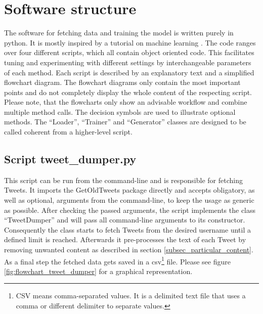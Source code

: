 \documentclass[hidelinks, conference]{IEEEtran}
\begin{document}
\section{Software structure}

The software for fetching data and training the model is written purely in python. It is mostly inspired by a tutorial on machine learning \cite{tutrob}. The code ranges over four different scripts, which all contain object oriented code. This facilitates tuning and experimenting with different settings by interchangeable parameters of each method. Each script is described by an explanatory text and a simplified flowchart diagram. The flowchart diagrams only contain the most important points and do not completely display the whole content of the respecting script. Please note, that the flowcharts only show an advisable workflow and combine multiple method calls. The decision symbols are used to illustrate optional methods. The ``Loader'', ``Trainer'' and ``Generator'' classes are designed to be called coherent from a higher-level script.

\subsection{Script tweet\_dumper.py}

This script can be run from the command-line and is responsible for fetching Tweets. It imports the GetOldTweets package directly and accepts obligatory, as well as optional, arguments from the command-line, to keep the usage as generic as possible. After checking the passed arguments, the script implements the class ``TweetDumper'' and will pass all command-line arguments to its constructor. Consequently the class starts to fetch Tweets from the desired username until a defined limit is reached. Afterwards it pre-processes the text of each Tweet by removing unwanted content as described in section \ref{subsec_particular_content}. As a final step the fetched data gets saved in a csv\footnote{CSV means comma-separated values. It is a delimited text file that uses a comma or different delimiter to separate values.} file. Please see figure \ref{fig:flowchart_tweet_dumper} for a graphical representation.
\end{document}
